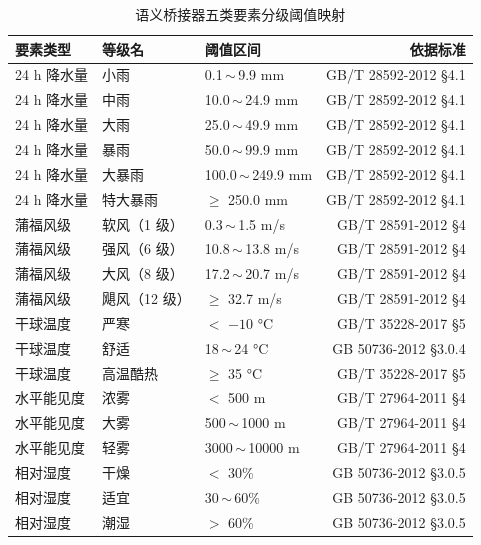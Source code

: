 \begin{table}[!ht]
    \centering
    \caption{语义桥接器五类要素分级阈值映射}
    \label{tab:semantic-mapping}
    \song\fontsize{9pt}{12pt}\selectfont
    \renewcommand{\arraystretch}{0.95}
    \begin{tabular}{lllr}
        \toprule
        要素类型 & 等级名 & 阈值区间 & 依据标准 \\
        \midrule
        24 h 降水量 & 小雨 & 0.1\,$\sim$\,9.9 mm & GB/T 28592-2012 §4.1 \\
        24 h 降水量 & 中雨 & 10.0\,$\sim$\,24.9 mm & GB/T 28592-2012 §4.1 \\
        24 h 降水量 & 大雨 & 25.0\,$\sim$\,49.9 mm & GB/T 28592-2012 §4.1 \\
        24 h 降水量 & 暴雨 & 50.0\,$\sim$\,99.9 mm & GB/T 28592-2012 §4.1 \\
        24 h 降水量 & 大暴雨 & 100.0\,$\sim$\,249.9 mm & GB/T 28592-2012 §4.1 \\
        24 h 降水量 & 特大暴雨 & $\geq$ 250.0 mm & GB/T 28592-2012 §4.1 \\
        \midrule
        蒲福风级 & 软风（1 级） & 0.3\,$\sim$\,1.5 m/s & GB/T 28591-2012 §4 \\
        蒲福风级 & 强风（6 级） & 10.8\,$\sim$\,13.8 m/s & GB/T 28591-2012 §4 \\
        蒲福风级 & 大风（8 级） & 17.2\,$\sim$\,20.7 m/s & GB/T 28591-2012 §4 \\
        蒲福风级 & 飓风（12 级） & $\geq$ 32.7 m/s & GB/T 28591-2012 §4 \\
        \midrule
        干球温度 & 严寒 & $<$ $-10$ °C & GB/T 35228-2017 §5 \\
        干球温度 & 舒适 & 18\,$\sim$\,24 °C & GB 50736-2012 §3.0.4 \\
        干球温度 & 高温酷热 & $\geq$ 35 °C & GB/T 35228-2017 §5 \\
        \midrule
        水平能见度 & 浓雾 & $<$ 500 m & GB/T 27964-2011 §4 \\
        水平能见度 & 大雾 & 500\,$\sim$\,1000 m & GB/T 27964-2011 §4 \\
        水平能见度 & 轻雾 & 3000\,$\sim$\,10000 m & GB/T 27964-2011 §4 \\
        \midrule
        相对湿度 & 干燥 & $<$ 30\% & GB 50736-2012 §3.0.5 \\
        相对湿度 & 适宜 & 30\,$\sim$\,60\% & GB 50736-2012 §3.0.5 \\
        相对湿度 & 潮湿 & $>$ 60\% & GB 50736-2012 §3.0.5 \\
        \bottomrule
    \end{tabular}
\end{table}

